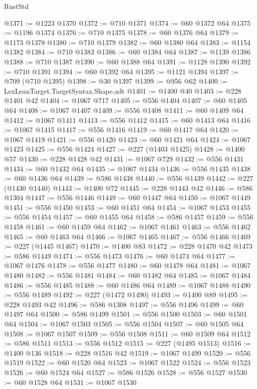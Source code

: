 \begin{lexlean}{RustStd}
\begin{coremodule}
{\begin{coremodule}
{{{{{{{{{{{{{{{{{{{{{{{{{{{{{@1371 := @1223 @1370
@1372 := @710 @1371
@1374 := @60 @1372 @64
@1375 := @1196 @1374
@1376 := @710 @1375
@1378 := @60 @1376 @64
@1379 := @1173 @1378
@1380 := @710 @1379
@1382 := @60 @1380 @64
@1383 := @1154 @1382
@1384 := @710 @1383
@1386 := @60 @1384 @64
@1387 := @1139 @1386
@1388 := @710 @1387
@1390 := @60 @1388 @64
@1391 := @1128 @1390
@1392 := @710 @1391
@1394 := @60 @1392 @64
@1395 := @1121 @1394
@1397 := @709 (@710 @1395)
@1398 := @30 @1397
@1399 := @956 @62
@1400 := LexLeanTarget.TargetSyntax.Shape.adt
@1401 := @1400 @40
@1403 := @228 @1401 @42
@1404 := @1067 @717
@1405 := @556 @1404
@1407 := @60 @1405 @64
@1408 := @1067 @1407
@1409 := @556 @1408
@1411 := @60 @1409 @64
@1412 := @1067 @1411
@1413 := @556 @1412
@1415 := @60 @1413 @64
@1416 := @1067 @1415
@1417 := @556 @1416
@1419 := @60 @1417 @64
@1420 := @1067 @1419
@1421 := @556 @1420
@1423 := @60 @1421 @64
@1424 := @1067 @1423
@1425 := @556 @1424
@1427 := @227 (@1403 @1425)
@1428 := @1400 @57
@1430 := @228 @1428 @42
@1431 := @1067 @729
@1432 := @556 @1431
@1434 := @60 @1432 @64
@1435 := @1067 @1434
@1436 := @556 @1435
@1438 := @60 @1436 @64
@1439 := @586 @1438
@1440 := @556 @1439
@1442 := @227 (@1430 @1440)
@1443 := @1400 @72
@1445 := @228 @1443 @42
@1446 := @586 @1304
@1447 := @556 @1446
@1449 := @60 @1447 @64
@1450 := @1067 @1449
@1451 := @556 @1450
@1453 := @60 @1451 @64
@1454 := @1067 @1453
@1455 := @556 @1454
@1457 := @60 @1455 @64
@1458 := @586 @1457
@1459 := @556 @1458
@1461 := @60 @1459 @64
@1462 := @1067 @1461
@1463 := @556 @1462
@1465 := @60 @1463 @64
@1466 := @1067 @1465
@1467 := @556 @1466
@1469 := @227 (@1445 @1467)
@1470 := @1400 @83
@1472 := @228 @1470 @42
@1473 := @586 @1449
@1474 := @556 @1473
@1476 := @60 @1474 @64
@1477 := @1067 @1476
@1478 := @556 @1477
@1480 := @60 @1478 @64
@1481 := @1067 @1480
@1482 := @556 @1481
@1484 := @60 @1482 @64
@1485 := @1067 @1484
@1486 := @556 @1485
@1488 := @60 @1486 @64
@1489 := @1067 @1488
@1490 := @556 @1489
@1492 := @227 (@1472 @1490)
@1493 := @1400 @89
@1495 := @228 @1493 @42
@1496 := @586 @1308
@1497 := @556 @1496
@1499 := @60 @1497 @64
@1500 := @586 @1499
@1501 := @556 @1500
@1503 := @60 @1501 @64
@1504 := @1067 @1503
@1505 := @556 @1504
@1507 := @60 @1505 @64
@1508 := @1067 @1507
@1509 := @556 @1508
@1511 := @60 @1509 @64
@1512 := @586 @1511
@1513 := @556 @1512
@1515 := @227 (@1495 @1513)
@1516 := @1400 @136
@1518 := @228 @1516 @42
@1519 := @1067 @1499
@1520 := @556 @1519
@1522 := @60 @1520 @64
@1523 := @1067 @1522
@1524 := @556 @1523
@1526 := @60 @1524 @64
@1527 := @586 @1526
@1528 := @556 @1527
@1530 := @60 @1528 @64
@1531 := @1067 @1530
}}}}}}}}}}}}}}}}}}}}}}}}}}}}}
\end{coremodule}}
\end{coremodule}
\end{lexlean}
